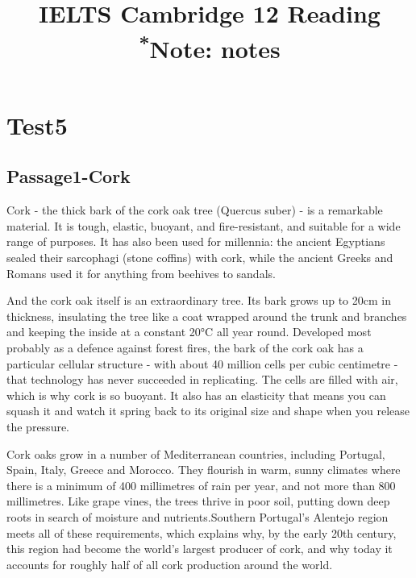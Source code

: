 \documentclass[conference]{IEEEtran}
\begin{document}
\title{IELTS Cambridge 12 Reading\\
{\footnotesize \textsuperscript{*}Note:
notes}
}

\maketitle


\section{Test5}

\subsection{Passage1-Cork}

Cork - the thick bark of the cork oak tree (Quercus suber) - 
is a remarkable material. It is tough, elastic, buoyant, and fire-resistant, 
and suitable for a wide range of purposes. 
It has also been used for millennia: 
the ancient Egyptians sealed their sarcophagi (stone coffins) with cork, 
while the ancient Greeks and Romans used it for anything from beehives to sandals.

And the cork oak itself is an extraordinary tree. 
Its bark grows up to 20cm in thickness, 
insulating the tree like a coat wrapped around the trunk and branches 
and keeping the inside at a constant 20°C all year round. 
Developed most probably as a defence against forest fires, 
the bark of the cork oak has a particular cellular structure - 
with about 40 million cells per cubic centimetre - 
that technology has never succeeded in replicating. 
The cells are filled with air, which is why cork is so buoyant. 
It also has an elasticity that means you can squash it 
and watch it spring back to its original size and shape when you release the pressure.

Cork oaks grow in a number of Mediterranean countries, 
including Portugal, Spain, Italy, Greece and Morocco. 
They flourish in warm, 
sunny climates where there is a minimum of 400 millimetres of rain per year, 
and not more than 800 millimetres. 
Like grape vines, the trees thrive in poor soil, 
putting down deep roots in search of moisture 
and nutrients.Southern Portugal's Alentejo region meets all of these requirements,
which explains why, by the early 20th century, 
this region had become the world's largest producer of cork, 
and why today it accounts for roughly half of all cork production around the world.
\end{document}
